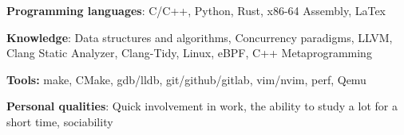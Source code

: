 \textbf{Programming languages}: C/C++, Python, Rust, x86-64 Assembly, LaTex

\textbf{Knowledge}: Data structures and algorithms, Concurrency paradigms, LLVM, Clang Static Analyzer, Clang-Tidy, Linux, eBPF, C++ Metaprogramming

\textbf{Tools:} make, CMake, gdb/lldb, git/github/gitlab, vim/nvim, perf, Qemu

\textbf{Personal qualities}: Quick involvement in work, the ability to study a lot for a short time, sociability